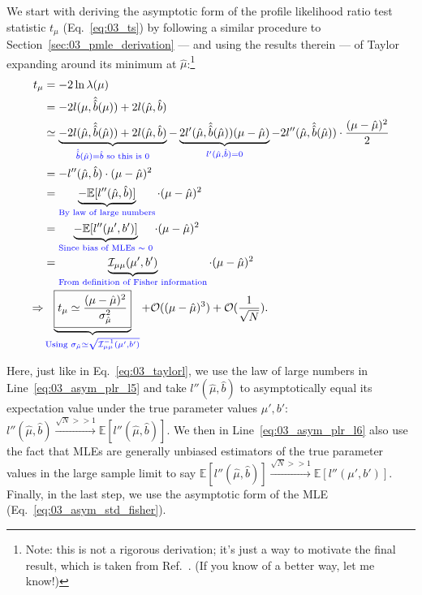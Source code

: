 We start with deriving the asymptotic form of the profile likelihood ratio test statistic $t_\mu$ (Eq.~\ref{eq:03_ts}) by following a similar procedure to Section~\ref{sec:03_pmle_derivation} --- and using the results therein --- of Taylor expanding around its minimum at $\hat\mu$:\footnote{Note: this is not a rigorous derivation; it's just a way to motivate the final result, which is taken from Ref.~\cite{Cowan:2010js}.
(If you know of a better way, let me know!)}
\begin{align}
    t_\mu &= -2\ln\lambda(\mu) \\
         &= -2l(\mu, \hat{\hat{b}}(\mu)) + 2l(\hat\mu, \hat{b}) \\
         &\simeq 
        \underbrace{-2l(\hat\mu, \hat{\hat{b}}(\hat\mu)) + 2l(\hat\mu, \hat{b})}_{\textcolor{blue}{\hat{\hat{b}}(\hat\mu)=\hat b \text{ so this is 0}}} -
        \underbrace{2l'(\hat\mu, \hat{\hat{b}}(\hat\mu))(\mu-\hat\mu)}_{\textcolor{blue}{l'(\hat\mu, \hat b) = 0}} - 2l''(\hat\mu, \hat{\hat{b}}(\hat\mu))\cdot\frac{(\mu-\hat\mu)^2}{2} \\
        &= -l''(\hat\mu, \hat b) \cdot (\mu-\hat\mu)^2 \\
        &= \underbrace{-\mathbb E[l''(\hat\mu, \hat b)]}_{\textcolor{blue}{\text{By law of large numbers}}} \cdot (\mu-\hat\mu)^2 \label{eq:03_asym_plr_l5} \\
        &= \underbrace{-\mathbb E[l''(\mu', b')]}_{\textcolor{blue}{\text{Since bias of MLEs $\sim$ 0}}} \cdot (\mu-\hat\mu)^2 \label{eq:03_asym_plr_l6} \\
        &= \underbrace{\mathcal I_{\mu\mu}(\mu', b')}_{\textcolor{blue}{\text{From definition of Fisher information}}} \cdot (\mu-\hat\mu)^2 \\
 \Rightarrow  & \underbrace{\boxed{t_\mu \simeq \frac{(\mu-\hat\mu)^2}{\sigma_{\hat\mu}^2}}}_{\textcolor{blue}{\text{Using } \sigma_{\hat\mu} \simeq \sqrt{\mathcal I^{-1}_{\mu\mu}(\mu', b')}}} + \mathcal O((\mu-\hat\mu)^3) + \mathcal O(\frac{1}{\sqrt N}).
\label{eq:03_plr_taylor}
\end{align}

Here, just like in Eq.~\ref{eq:03_taylorl}, we use the law of large numbers in Line~\ref{eq:03_asym_plr_l5} and take $l''(\hat\mu, \hat b)$ to asymptotically equal its expectation value under the true parameter values $\mu', b'$: $l''(\hat\mu, \hat b) \xrightarrow{\sqrt{N} >> 1} \mathbb E[l''(\hat\mu, \hat b)]$.
We then in Line~\ref{eq:03_asym_plr_l6} also use the fact that MLEs are generally unbiased estimators of the true parameter values in the large sample limit to say $\mathbb E[l''(\hat\mu, \hat b)] \xrightarrow{\sqrt{N} >> 1} \mathbb E[l''(\mu', b')]$.
Finally, in the last step, we use the asymptotic form of the MLE (Eq.~\ref{eq:03_asym_std_fisher}).


